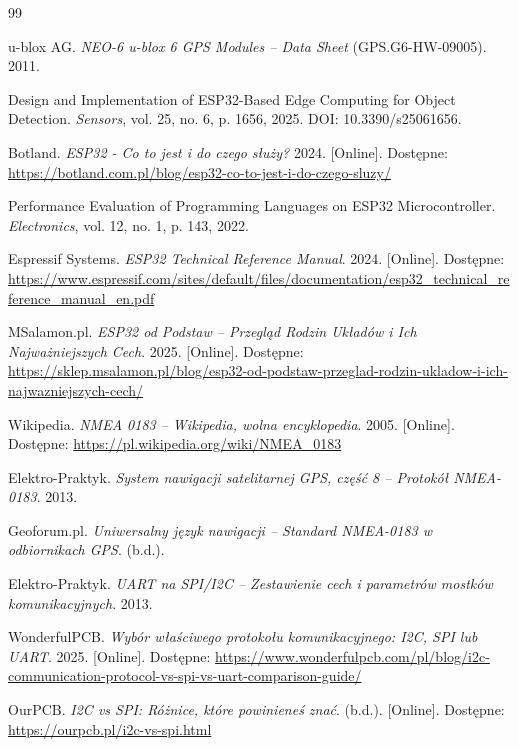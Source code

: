 \documentclass[12pt, a4paper]{EE-dyplom}
\begin{document}
\newpage
\begin{thebibliography}{99}

u-blox AG. \textit{NEO-6 u-blox 6 GPS Modules – Data Sheet} (GPS.G6-HW-09005). 2011.

Design and Implementation of ESP32-Based Edge Computing for Object Detection. \textit{Sensors}, vol. 25, no. 6, p. 1656, 2025. DOI: 10.3390/s25061656.

Botland. \textit{ESP32 - Co to jest i do czego służy?} 2024. [Online]. Dostępne: \url{https://botland.com.pl/blog/esp32-co-to-jest-i-do-czego-sluzy/}

Performance Evaluation of Programming Languages on ESP32 Microcontroller. \textit{Electronics}, vol. 12, no. 1, p. 143, 2022.

Espressif Systems. \textit{ESP32 Technical Reference Manual}. 2024. [Online]. Dostępne: \url{https://www.espressif.com/sites/default/files/documentation/esp32_technical_reference_manual_en.pdf}

MSalamon.pl. \textit{ESP32 od Podstaw – Przegląd Rodzin Układów i Ich Najważniejszych Cech}. 2025. [Online]. Dostępne: \url{https://sklep.msalamon.pl/blog/esp32-od-podstaw-przeglad-rodzin-ukladow-i-ich-najwazniejszych-cech/}

Wikipedia. \textit{NMEA 0183 – Wikipedia, wolna encyklopedia}. 2005. [Online]. Dostępne: \url{https://pl.wikipedia.org/wiki/NMEA_0183}

Elektro-Praktyk. \textit{System nawigacji satelitarnej GPS, część 8 – Protokół NMEA-0183}. 2013.

Geoforum.pl. \textit{Uniwersalny język nawigacji – Standard NMEA-0183 w odbiornikach GPS}. (b.d.).

Elektro-Praktyk. \textit{UART na SPI/I2C – Zestawienie cech i parametrów mostków komunikacyjnych}. 2013.

WonderfulPCB. \textit{Wybór właściwego protokołu komunikacyjnego: I2C, SPI lub UART}. 2025. [Online]. Dostępne: \url{https://www.wonderfulpcb.com/pl/blog/i2c-communication-protocol-vs-spi-vs-uart-comparison-guide/}

OurPCB. \textit{I2C vs SPI: Różnice, które powinieneś znać}. (b.d.). [Online]. Dostępne: \url{https://ourpcb.pl/i2c-vs-spi.html}


\end{thebibliography}
\end{document}
